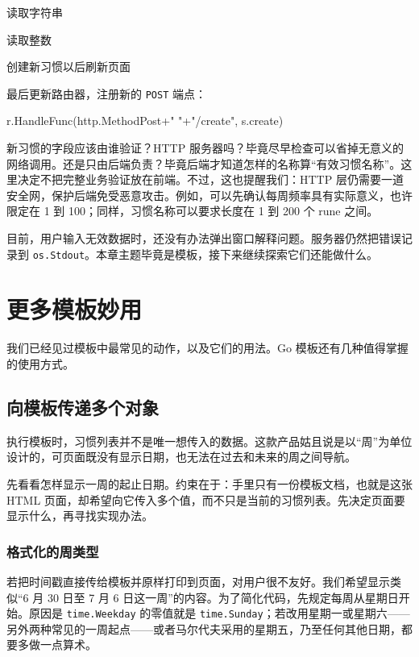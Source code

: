 \begin{codeannotations}
\item 读取字符串
\item 读取整数
\item 创建新习惯以后刷新页面
\end{codeannotations}

最后更新路由器，注册新的 \texttt{POST} 端点：

\begin{gocode}[]
r.HandleFunc(http.MethodPost+" "+"/create", s.create)
\end{gocode}

新习惯的字段应该由谁验证？HTTP 服务器吗？毕竟尽早检查可以省掉无意义的网络调用。还是只由后端负责？毕竟后端才知道怎样的名称算“有效习惯名称”。这里决定不把完整业务验证放在前端。不过，这也提醒我们：HTTP 层仍需要一道安全网，保护后端免受恶意攻击。例如，可以先确认每周频率具有实际意义，也许限定在 1 到 100；同样，习惯名称可以要求长度在 1 到 200 个 rune 之间。

目前，用户输入无效数据时，还没有办法弹出窗口解释问题。服务器仍然把错误记录到 \texttt{os.Stdout}。本章主题毕竟是模板，接下来继续探索它们还能做什么。

\section{更多模板妙用}

我们已经见过模板中最常见的动作，以及它们的用法。Go 模板还有几种值得掌握的使用方式。

\subsection{向模板传递多个对象}
\label{sec:ch11-multiple-values}

执行模板时，习惯列表并不是唯一想传入的数据。这款产品姑且说是以“周”为单位设计的，可页面既没有显示日期，也无法在过去和未来的周之间导航。

先看看怎样显示一周的起止日期。约束在于：手里只有一份模板文档，也就是这张 HTML 页面，却希望向它传入多个值，而不只是当前的习惯列表。先决定页面要显示什么，再寻找实现办法。

\subsubsection{格式化的周类型}

若把时间戳直接传给模板并原样打印到页面，对用户很不友好。我们希望显示类似“6 月 30 日至 7 月 6 日这一周”的内容。为了简化代码，先规定每周从星期日开始。原因是 \texttt{time.Weekday} 的零值就是 \texttt{time.Sunday}；若改用星期一或星期六——另外两种常见的一周起点——或者马尔代夫采用的星期五，乃至任何其他日期，都要多做一点算术。

